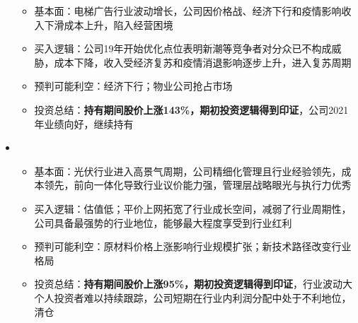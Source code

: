 \begin{itemize}[leftmargin=*]
{\begin{itemize}
        \item 基本面：电梯广告行业波动增长，公司因价格战、经济下行和疫情影响收入下滑成本上升，陷入经营困境
        \item 买入逻辑：公司19年开始优化点位表明新潮等竞争者对分众已不构成威胁，成本下降，收入受经济复苏和疫情消退影响逐步上升，进入复苏周期
        \item 预判可能利空：经济下行；物业公司抢占市场
        \item 投资总结：\textbf{持有期间股价上涨143\%，期初投资逻辑得到印证}，公司2021年业绩向好，继续持有
      \end{itemize}
      }
      \item
      {\small
      \begin{itemize}
        \item 基本面：光伏行业进入高景气周期，公司精细化管理且行业经验领先，成本领先，前向一体化导致行业议价能力强，管理层战略眼光与执行力优秀
        \item 买入逻辑：估值低；平价上网拓宽了行业成长空间，减弱了行业周期性，公司具备最强势的行业地位，能够最大程度享受到行业红利
        \item 预判可能利空：原材料价格上涨影响行业规模扩张；新技术路径改变行业格局
        \item 投资总结：\textbf{持有期间股价上涨95\%，期初投资逻辑得到印证}，行业波动大个人投资者难以持续跟踪，公司短期在行业内利润分配中处于不利地位，清仓
      \end{itemize}
      }
  \end{itemize}